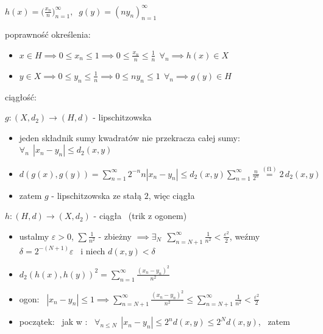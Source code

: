 \documentclass[a4paper,12pt]{article}
\begin{document}
\smallskip
\(h(x) = \big(\frac{x_n}{n}\big)_{n=1}^{\infty}, \;\; g(y) = (n y_n)_{n=1}^{\infty}\)
\begin{steps}
    \item poprawność określenia:
    \begin{itemize}
        \item \(x \in H \implies 0 \leq x_n \leq 1 \implies 0 \leq \frac{x_n}{n} \leq \frac{1}{n} \;\, \forall_n \implies h(x) \in X\)
        \item \(y \in X \implies 0 \leq y_n \leq \frac{1}{n} \implies 0 \leq n y_n \leq 1 \;\, \forall_n \implies g(y) \in H\)
    \end{itemize}
    \item ciągłość:
    \begin{podpunkty}
        \item \(g: (X, d_2) \to (H, d)\) - lipschitzowska
        \begin{itemize}
            \item jeden składnik sumy kwadratów nie przekracza całej sumy: \, \(\forall_n \;\, |x_n - y_n| \leq d_2(x, y)\)
            \item \(d(g(x), g(y)) = \displaystyle\sum_{n=1}^{\infty} 2^{-n} n |x_n - y_n| \leq d_2(x, y) \displaystyle\sum_{n=1}^{\infty} \frac{n}{2^n} \overset{(\text{f1})}{=} 2 \, d_2(x, y)\)
            \item zatem \(g\) - lipschitzowska ze stałą \(2\), więc ciągła
        \end{itemize}
        \item \(h: (H, d) \to (X, d_2)\) - ciągła \, (trik z ogonem)
        \begin{itemize}
            \item ustalmy \(\varepsilon > 0\), \; \(\sum \frac{1}{n^2}\) - zbieżny \(\implies \exists_N \;\, \sum_{n=N+1}^{\infty} \frac{1}{n^2} < \frac{\varepsilon^2}{2}\), \; weźmy \(\delta = 2^{-(N+1)} \varepsilon\) \, i niech \(d(x, y) < \delta\)
            \item \(d_2(h(x), h(y))^2 = \displaystyle\sum_{n=1}^{\infty} \frac{(x_n - y_n)^2}{n^2}\)
            \item ogon: \, \(|x_n - y_n| \leq 1 \implies \displaystyle\sum_{n=N+1}^{\infty} \frac{(x_n - y_n)^2}{n^2} \leq \displaystyle\sum_{n=N+1}^{\infty} \frac{1}{n^2} < \frac{\varepsilon^2}{2}\)
            \item początek: \, jak w : \, \(\forall_{n \leq N} \;\, |x_n - y_n| \leq 2^n d(x, y) \leq 2^N d(x, y)\), \, zatem
            \begin{align*}

\end{align*}
\end{itemize}
\end{podpunkty}
\end{steps}
\end{document}
